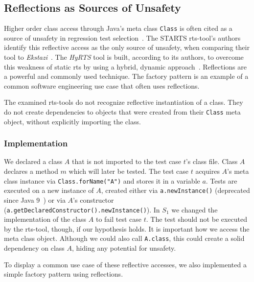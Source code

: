 \subsection{Reflections as Sources of Unsafety}

Higher order class access through Java's meta class \texttt{Class} is often cited as a source of unsafety
in regression test selection~\cite{ekstazimain,starts_paper,unsafety_eval,prestarts}. The STARTS
\ac{rts}-tool's authors identify this reflective access as the only source of unsafety, when
comparing their tool to \emph{Ekstazi}~\cite{starts_paper}. The \emph{HyRTS} tool is built, according to its
authors, to overcome this weakness of static \ac{rts} by using a hybrid, dynamic
approach~\cite{hyrts_paper}. Reflections are a powerful and commonly used technique. The factory pattern
is an example of a common software engineering use case that often uses reflections.

\begin{hypothesis}\label{hyp:reflections}
    The examined \ac{rts}-tools do not recognize reflective instantiation of a class. They do not create
    dependencies to objects that were created from their \texttt{Class} meta object, without explicitly importing
    the class.
\end{hypothesis}

\subsubsection{Implementation }
We declared a class $A$ that is not imported to the test case $t$'s class file. Class $A$ declares a
method $m$ which will later be tested. The test case $t$ acquires $A$'s meta class instance via
\texttt{Class.forName("A")} and stores it in a variable $a$. Tests are executed on a new instance of
$A$, created either via \texttt{a.newInstance()} (deprecated since Java
9~\cite{java_9_class_api_docs}) or via $A$'s constructor
(\texttt{a.getDeclaredConstructor().newInstance()}). In $S_1$ we changed the implementation of the
class $A$ to fail test case $t$. The test should not be executed by the
\ac{rts}-tool, though, if our hypothesis holds. It is important how we access the meta
class object. Although we could also call \texttt{A.class}, this could create a solid
dependency on class $A$, hiding any potential for unsafety.

To display a common use case of these reflective accesses, we also implemented a simple factory
pattern using reflections.

